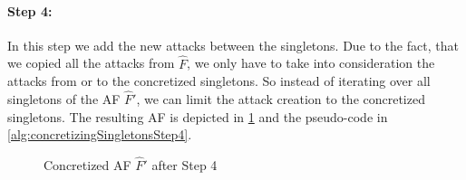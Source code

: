 \paragraph{Step 4:} In this step we add the new attacks between the singletons. Due to the fact, that we copied all the attacks from $\hat{F}$, we only have to take into consideration the attacks from or to the concretized singletons. So instead of iterating over all singletons of the AF $\hat{F}'$, we can limit the attack creation to the concretized singletons. The resulting AF is depicted in \cref{example:algorithmConcretizeSingletonsStep4} and the pseudo-code in \cref{alg:concretizingSingletonsStep4}.


\vspace{0.3cm}
\begin{figure}[h]
    \centering
    \caption{Concretized AF $\hat{F}'$ after Step 4}
    \label{example:algorithmConcretizeSingletonsStep4}
\end{figure}
\vspace{-0.2cm}


